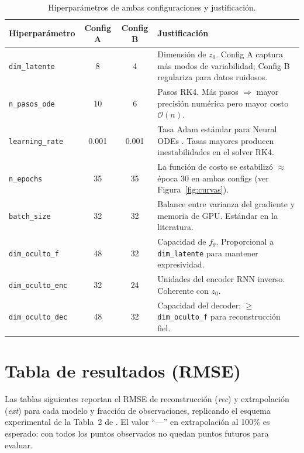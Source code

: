 \documentclass[12pt,a4paper]{article}
\begin{document}
\begin{table}[H]
  \centering
  \caption{Hiperparámetros de ambas configuraciones y justificación.}
  \label{tab:hiperparametros}
  \small
  \begin{tabularx}{\linewidth}{lccX}
    \toprule
    \textbf{Hiperparámetro} & \textbf{Config A} & \textbf{Config B} & \textbf{Justificación} \\
    \midrule
    \texttt{dim\_latente}    & 8    & 4    & Dimensión de $z_0$. Config A captura más modos de variabilidad; Config B regulariza para datos ruidosos. \\[4pt]
    \texttt{n\_pasos\_ode}   & 10   & 6    & Pasos RK4. Más pasos $\Rightarrow$ mayor precisión numérica pero mayor costo $\mathcal{O}(n)$. \\[4pt]
    \texttt{learning\_rate}  & 0.001 & 0.001 & Tasa Adam estándar para Neural ODEs \cite{chen2018}. Tasas mayores producen inestabilidades en el solver RK4. \\[4pt]
    \texttt{n\_epochs}       & 35   & 35   & La función de costo se estabilizó $\approx$ época 30 en ambas configs (ver Figura~\ref{fig:curvas}). \\[4pt]
    \texttt{batch\_size}     & 32   & 32   & Balance entre varianza del gradiente y memoria de GPU. Estándar en la literatura. \\[4pt]
    \texttt{dim\_oculto\_f}  & 48   & 32   & Capacidad de $f_\theta$. Proporcional a \texttt{dim\_latente} para mantener expresividad. \\[4pt]
    \texttt{dim\_oculto\_enc}& 32   & 24   & Unidades del encoder RNN inverso. Coherente con $z_0$. \\[4pt]
    \texttt{dim\_oculto\_dec}& 48   & 32   & Capacidad del decoder; $\geq$ \texttt{dim\_oculto\_f} para reconstrucción fiel. \\
    \bottomrule
  \end{tabularx}
\end{table}

\section{Tabla de resultados (RMSE)}
\label{sec:resultados}

Las tablas siguientes reportan el RMSE de reconstrucción (\emph{rec}) y
extrapolación (\emph{ext}) para cada modelo y fracción de observaciones,
replicando el esquema experimental de la Tabla~2 de \citet{rubanova2019}.
El valor ``---'' en extrapolación al 100\% es esperado: con todos los puntos
observados no quedan puntos futuros para evaluar.
\end{document}
